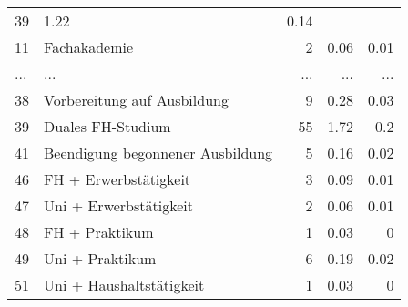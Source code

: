 \begin{longtable}{lXrrr}
          \num{39} &
          \num[round-mode=places,round-precision=2]{1.22} &
          \num[round-mode=places,round-precision=2]{0.14} \\
        11 & \multicolumn{1}{X}{Fachakademie} & %
          \num{2} &
          \num[round-mode=places,round-precision=2]{0.06} &
          \num[round-mode=places,round-precision=2]{0.01} \\
       ... & ... & ... & ... & ... \\
        38 & \multicolumn{1}{X}{Vorbereitung auf Ausbildung} & %
          \num{9} &
          \num[round-mode=places,round-precision=2]{0.28} &
          \num[round-mode=places,round-precision=2]{0.03} \\

        39 & \multicolumn{1}{X}{Duales FH-Studium} & %
          \num{55} &
          \num[round-mode=places,round-precision=2]{1.72} &
          \num[round-mode=places,round-precision=2]{0.2} \\

        41 & \multicolumn{1}{X}{Beendigung begonnener Ausbildung} & %
          \num{5} &
          \num[round-mode=places,round-precision=2]{0.16} &
          \num[round-mode=places,round-precision=2]{0.02} \\

        46 & \multicolumn{1}{X}{FH + Erwerbstätigkeit} & %
          \num{3} &
          \num[round-mode=places,round-precision=2]{0.09} &
          \num[round-mode=places,round-precision=2]{0.01} \\

        47 & \multicolumn{1}{X}{Uni + Erwerbstätigkeit} & %
          \num{2} &
          \num[round-mode=places,round-precision=2]{0.06} &
          \num[round-mode=places,round-precision=2]{0.01} \\

        48 & \multicolumn{1}{X}{FH + Praktikum} & %
          \num{1} &
          \num[round-mode=places,round-precision=2]{0.03} &
          \num[round-mode=places,round-precision=2]{0} \\

        49 & \multicolumn{1}{X}{Uni + Praktikum} & %
          \num{6} &
          \num[round-mode=places,round-precision=2]{0.19} &
          \num[round-mode=places,round-precision=2]{0.02} \\

        51 & \multicolumn{1}{X}{Uni + Haushaltstätigkeit} & %
          \num{1} &
          \num[round-mode=places,round-precision=2]{0.03} &
          \num[round-mode=places,round-precision=2]{0} \\


\end{longtable}
